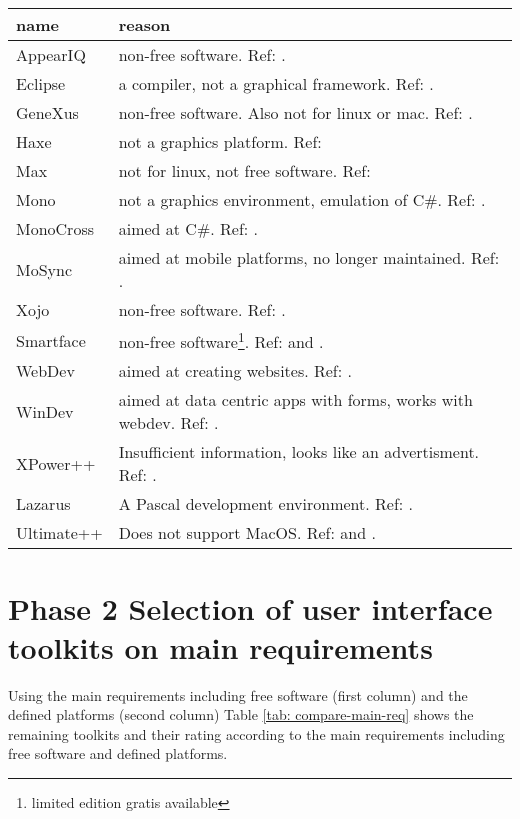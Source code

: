 \begin{center}
    \begin{tabular}{|p{7em}|p{25em}|}
	\hline
	{\bf name} & {\bf reason}\\\hline
	AppearIQ & non-free software. Ref: \cite{appear:appeariq}.\\
	Eclipse & a compiler, not a graphical framework. Ref: \cite{wiki:eclipse}.\\
	GeneXus & non-free software. Also not for linux
		    or mac. Ref: \cite{wiki:genexus}. \\
	Haxe & not a graphics platform. Ref: \cite{wiki:haxe}\\
	Max & not for linux, not free software. Ref: \cite{wiki:max}\\
	Mono & not a graphics environment, emulation
		of C\#. Ref: \cite{wiki:mono}.\\
	MonoCross & aimed at C\#. Ref: \cite{wiki:monocross}.\\
	MoSync & aimed at mobile platforms, no longer maintained. Ref: \cite{wiki:mosync}.\\
	Xojo & non-free software. Ref: \cite{wiki:xojo}.\\
	Smartface & non-free software\footnote{limited edition gratis available}. Ref: \cite{wiki:smartface} and \cite{smartface:license}.\\
	WebDev & aimed at creating websites. Ref: \cite{wiki:webdev}.\\
	WinDev & aimed at data centric apps with forms, works with webdev. Ref: \cite{wiki:windev}.\\
	XPower++ & Insufficient information, looks like an advertisment. Ref: \cite{wiki:xpower++}.\\
	Lazarus & A Pascal development environment. Ref: \cite{wiki:lazarus}.\\
	Ultimate++ & Does not support MacOS. Ref: \cite{wiki:ultimate++} and \cite{wxwidget:comparison}.\\
	\hline
    \end{tabular}
	\label{tab:discarded-toolkits}
\end{center}


\section{Phase 2 Selection of user interface toolkits on main requirements}

Using the main requirements including free software (first column) and the
defined platforms (second column) Table \ref{tab: compare-main-req} shows the
remaining toolkits and their rating according to the main requirements
including free software and defined platforms.

